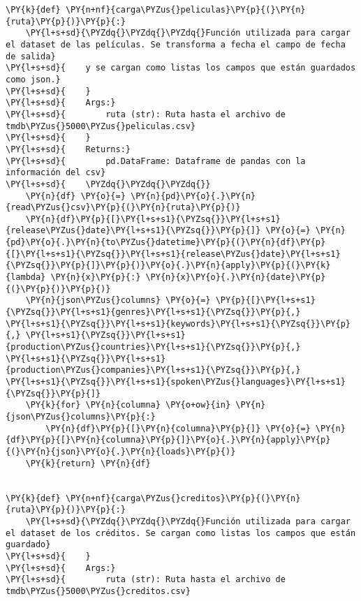     \begin{tcolorbox}[breakable, size=fbox, boxrule=1pt, pad at break*=1mm,colback=cellbackground, colframe=cellborder]
\begin{Verbatim}[commandchars=\\\{\}]
\PY{k}{def} \PY{n+nf}{carga\PYZus{}peliculas}\PY{p}{(}\PY{n}{ruta}\PY{p}{)}\PY{p}{:}
    \PY{l+s+sd}{\PYZdq{}\PYZdq{}\PYZdq{}Función utilizada para cargar el dataset de las películas. Se transforma a fecha el campo de fecha de salida}
\PY{l+s+sd}{    y se cargan como listas los campos que están guardados como json.}
\PY{l+s+sd}{    }
\PY{l+s+sd}{    Args:}
\PY{l+s+sd}{        ruta (str): Ruta hasta el archivo de tmdb\PYZus{}5000\PYZus{}peliculas.csv}
\PY{l+s+sd}{    }
\PY{l+s+sd}{    Returns:}
\PY{l+s+sd}{        pd.DataFrame: Dataframe de pandas con la información del csv}
\PY{l+s+sd}{    \PYZdq{}\PYZdq{}\PYZdq{}}
    \PY{n}{df} \PY{o}{=} \PY{n}{pd}\PY{o}{.}\PY{n}{read\PYZus{}csv}\PY{p}{(}\PY{n}{ruta}\PY{p}{)}
    \PY{n}{df}\PY{p}{[}\PY{l+s+s1}{\PYZsq{}}\PY{l+s+s1}{release\PYZus{}date}\PY{l+s+s1}{\PYZsq{}}\PY{p}{]} \PY{o}{=} \PY{n}{pd}\PY{o}{.}\PY{n}{to\PYZus{}datetime}\PY{p}{(}\PY{n}{df}\PY{p}{[}\PY{l+s+s1}{\PYZsq{}}\PY{l+s+s1}{release\PYZus{}date}\PY{l+s+s1}{\PYZsq{}}\PY{p}{]}\PY{p}{)}\PY{o}{.}\PY{n}{apply}\PY{p}{(}\PY{k}{lambda} \PY{n}{x}\PY{p}{:} \PY{n}{x}\PY{o}{.}\PY{n}{date}\PY{p}{(}\PY{p}{)}\PY{p}{)}
    \PY{n}{json\PYZus{}columns} \PY{o}{=} \PY{p}{[}\PY{l+s+s1}{\PYZsq{}}\PY{l+s+s1}{genres}\PY{l+s+s1}{\PYZsq{}}\PY{p}{,} \PY{l+s+s1}{\PYZsq{}}\PY{l+s+s1}{keywords}\PY{l+s+s1}{\PYZsq{}}\PY{p}{,} \PY{l+s+s1}{\PYZsq{}}\PY{l+s+s1}{production\PYZus{}countries}\PY{l+s+s1}{\PYZsq{}}\PY{p}{,} \PY{l+s+s1}{\PYZsq{}}\PY{l+s+s1}{production\PYZus{}companies}\PY{l+s+s1}{\PYZsq{}}\PY{p}{,} \PY{l+s+s1}{\PYZsq{}}\PY{l+s+s1}{spoken\PYZus{}languages}\PY{l+s+s1}{\PYZsq{}}\PY{p}{]}
    \PY{k}{for} \PY{n}{columna} \PY{o+ow}{in} \PY{n}{json\PYZus{}columns}\PY{p}{:}
        \PY{n}{df}\PY{p}{[}\PY{n}{columna}\PY{p}{]} \PY{o}{=} \PY{n}{df}\PY{p}{[}\PY{n}{columna}\PY{p}{]}\PY{o}{.}\PY{n}{apply}\PY{p}{(}\PY{n}{json}\PY{o}{.}\PY{n}{loads}\PY{p}{)}
    \PY{k}{return} \PY{n}{df}


\PY{k}{def} \PY{n+nf}{carga\PYZus{}creditos}\PY{p}{(}\PY{n}{ruta}\PY{p}{)}\PY{p}{:}
    \PY{l+s+sd}{\PYZdq{}\PYZdq{}\PYZdq{}Función utilizada para cargar el dataset de los créditos. Se cargan como listas los campos que están guardado}
\PY{l+s+sd}{    }
\PY{l+s+sd}{    Args:}
\PY{l+s+sd}{        ruta (str): Ruta hasta el archivo de tmdb\PYZus{}5000\PYZus{}creditos.csv}


\end{Verbatim}
\end{tcolorbox}
